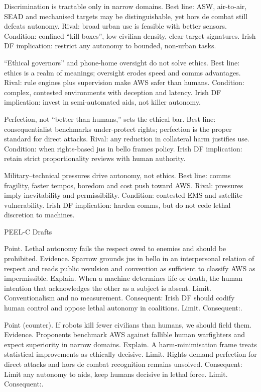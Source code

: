 Discrimination is tractable only in narrow domains.
Best line: ASW, air-to-air, SEAD and mechanised targets may be distinguishable, yet hors de combat still defeats autonomy.
Rival: broad urban use is feasible with better sensors.
Condition: confined “kill boxes”, low civilian density, clear target signatures.
Irish DF implication: restrict any autonomy to bounded, non-urban tasks.

“Ethical governors” and phone-home oversight do not solve ethics.
Best line: ethics is a realm of meanings; oversight erodes speed and comms advantages.
Rival: rule engines plus supervision make AWS safer than humans.
Condition: complex, contested environments with deception and latency.
Irish DF implication: invest in semi-automated aids, not killer autonomy.

Perfection, not “better than humans,” sets the ethical bar.
Best line: consequentialist benchmarks under-protect rights; perfection is the proper standard for direct attacks.
Rival: any reduction in collateral harm justifies use.
Condition: when rights-based jus in bello frames policy.
Irish DF implication: retain strict proportionality reviews with human authority.

Military–technical pressures drive autonomy, not ethics.
Best line: comms fragility, faster tempos, boredom and cost push toward AWS.
Rival: pressures imply inevitability and permissibility.
Condition: contested EMS and satellite vulnerability.
Irish DF implication: harden comms, but do not cede lethal discretion to machines.

PEEL-C Drafts

Point. Lethal autonomy fails the respect owed to enemies and should be prohibited.
Evidence. Sparrow grounds jus in bello in an interpersonal relation of respect and reads public revulsion and convention as sufficient to classify AWS as impermissible.
Explain. When a machine determines life or death, the human intention that acknowledges the other as a subject is absent.
Limit. Conventionalism and no measurement. Consequent: Irish DF should codify human control and oppose lethal autonomy in coalitions. Limit. Consequent:.

Point (counter). If robots kill fewer civilians than humans, we should field them.
Evidence. Proponents benchmark AWS against fallible human warfighters and expect superiority in narrow domains.
Explain. A harm-minimisation frame treats statistical improvements as ethically decisive.
Limit. Rights demand perfection for direct attacks and hors de combat recognition remains unsolved. Consequent: Limit any autonomy to aids, keep humans decisive in lethal force. Limit. Consequent:.

